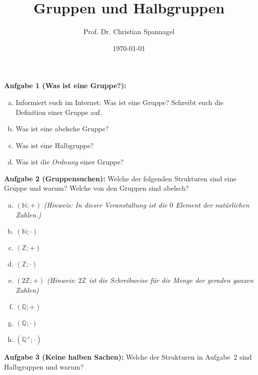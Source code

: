 \documentclass{../cssheet}
\title{Gruppen und Halbgruppen}
\author{Prof. Dr. Christian Spannagel}
\date{\today}
\begin{document}
\printtitle

\vspace*{10mm}

\textbf{Aufgabe 1 (Was ist eine Gruppe?):} 
\begin{enumerate}[a)]
\item Informiert euch im Internet: Was ist eine Gruppe? Schreibt euch die Definition einer Gruppe auf. 
\item Was ist eine abelsche Gruppe?
\item Was ist eine Halbgruppe?
\item Was ist die \emph{Ordnung} einer Gruppe?
\end{enumerate}

\textbf{Aufgabe 2 (Gruppensuchen):} Welche der folgenden Strukturen sind eine Gruppe und warum? Welche von den Gruppen sind abelsch?

\begin{enumerate}[a)]
\item $(\mathbb{N}; +)$ \emph{(Hinweis: In dieser Veranstaltung ist die $0$ Element der natürlichen Zahlen.)}
\item $(\mathbb{N}; \cdot)$
\item $(\mathbb{Z}; +)$
\item $(\mathbb{Z}; \cdot)$
\item $(2\mathbb{Z}; +)$ \emph{(Hinweis: $2\mathbb{Z}$ ist die Schreibweise für die Menge der geraden ganzen Zahlen)}
\item $(\mathbb{Q}; +)$
\item $(\mathbb{Q}; \cdot)$
\item $(\mathbb{Q}^{+}; \cdot)$
\end{enumerate}

\textbf{Aufgabe 3 (Keine halben Sachen):} Welche der Strukturen in Aufgabe~2 sind Halbgruppen und warum?


\vspace*{2cm}
\printlicense

\printsocials
\end{document}

